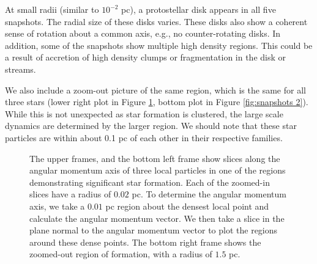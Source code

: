 \documentclass{emulateapj}
\begin{document}
At small radii (similar to $10^{-2}$ pc), a protostellar disk appears in all five snapshots. The radial size of these disks varies. These disks also show a coherent sense of rotation about a common axis, e.g., no counter-rotating disks. In addition, some of the snapshots show multiple high density regions.  This could be a result of accretion of high density clumps or fragmentation in the disk or streams.  

We also include a zoom-out picture of the same region, which is the same for all three stars (lower right plot in Figure \ref{fig:snapshots}, bottom plot in Figure \ref{fig:snapshots 2}).  While this is not unexpected as star formation is clustered, the large scale dynamics are determined by the larger region.  We should note that these star particles are within about 0.1 pc of each other in their respective families.  

\begin{figure}
\caption{The upper frames, and the bottom left frame show slices along the angular momentum axis of three local particles in one of the regions demonstrating significant star formation.  Each of the zoomed-in slices have a radius of $0.02$ pc.  To determine the angular momentum axis, we take a $0.01$ pc region about the densest local point and calculate the angular momentum vector.  We then take a slice in the plane normal to the angular momentum vector to plot the regions around these dense points.  The bottom right frame shows the zoomed-out region of formation, with a radius of $1.5$ pc.    \label{fig:snapshots}}
\end{figure}
\end{document}

